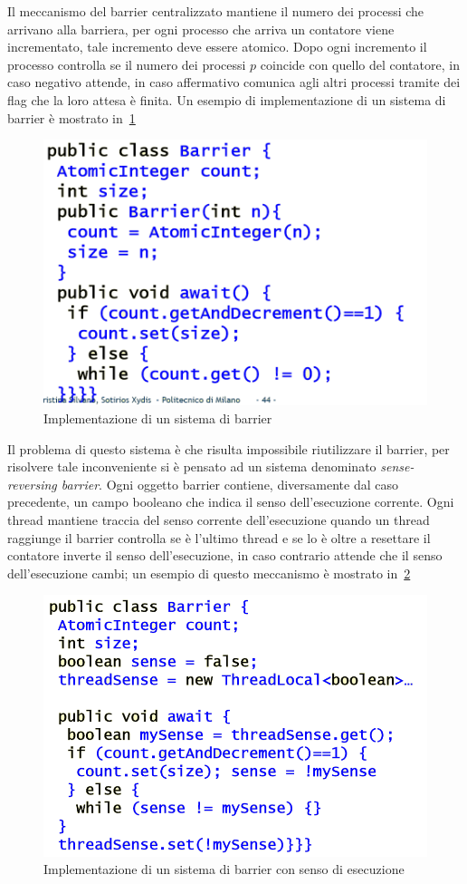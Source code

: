 Il meccanismo del barrier centralizzato mantiene il numero dei processi che arrivano alla barriera, per ogni processo che arriva un contatore viene incrementato, tale incremento deve essere atomico. Dopo ogni incremento il processo controlla se il numero dei processi $p$ coincide con quello del contatore, in caso negativo attende, in caso affermativo comunica agli altri processi tramite dei flag che la loro attesa è finita. Un esempio di implementazione di un sistema di barrier è mostrato in \figurename\,\ref{fig:barrierimp}
\begin{figure}[htb]
\centering
\includegraphics[scale=0.5]{img/barrierimp.png}
\caption{Implementazione di un sistema di barrier}\label{fig:barrierimp}
\end{figure}
Il problema di questo sistema è che risulta impossibile riutilizzare il barrier, per risolvere tale inconveniente si è pensato ad un sistema denominato \emph{sense-reversing barrier}. Ogni oggetto barrier contiene, diversamente dal caso precedente, un campo booleano che indica il senso dell'esecuzione corrente. Ogni thread mantiene traccia del senso corrente dell'esecuzione quando un thread raggiunge il barrier controlla se è l'ultimo thread e se lo è oltre a resettare il contatore inverte il senso dell'esecuzione, in caso contrario attende che il senso dell'esecuzione cambi; un esempio di questo meccanismo è mostrato in \figurename\,\ref{fig:barrierimp2}
\begin{figure}[htb]
\centering
\includegraphics[scale=0.5]{img/barrierimp2.png}
\caption{Implementazione di un sistema di barrier con senso di esecuzione}\label{fig:barrierimp2}
\end{figure}